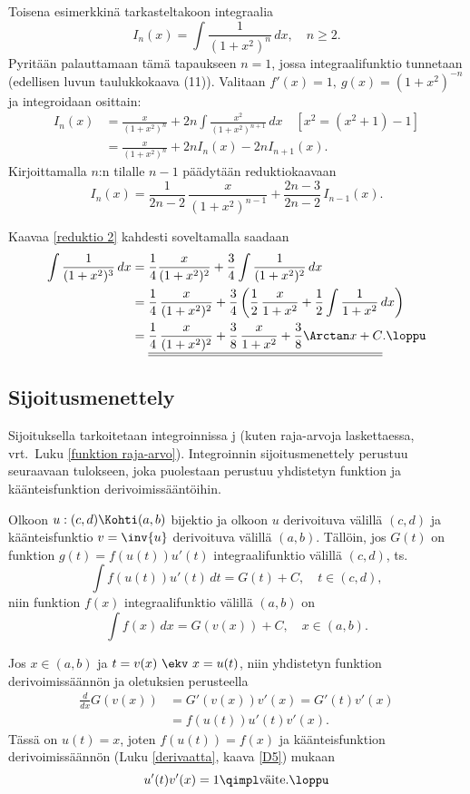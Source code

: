 Toisena esimerkkinä tarkasteltakoon integraalia
\[
I_n(x)=\int\frac{1}{(1+x^2)^n}\,dx,\quad n \ge 2.
\]
Pyritään palauttamaan tämä tapaukseen $n=1$, jossa integraalifunktio tunnetaan (edellisen
luvun taulukkokaava (11)). Valitaan $f'(x)=1,\ g(x)=(1+x^2)^{-n}$ ja integroidaan osittain:
\begin{align*}
I_n(x) &= \frac{x}{(1+x^2)^n}+2n\int\frac{x^2}{(1+x^2)^{n+1}}\, dx \quad [x^2=(x^2+1)-1] \\
&= \frac{x}{(1+x^2)^n}+2n I_n(x) - 2n I_{n+1}(x).
\end{align*}
Kirjoittamalla $n$:n tilalle $n-1$ päädytään reduktiokaavaan
\begin{equation} \label{reduktio 2}
I_n(x)=\frac{1}{2n-2}\,\frac{x}{(1+x^2)^{n-1}}+\frac{2n-3}{2n-2}\,I_{n-1}(x).
\end{equation}
\begin{Exa}
Kaavaa \eqref{reduktio 2} kahdesti soveltamalla saadaan
\begin{align*}
\int\frac{1}{(1+x^2)^3}\,dx 
&= \frac{1}{4}\frac{x}{(1+x^2)^2}+\frac{3}{4}\int\frac{1}{(1+x^2)^2}\,dx \\
&= \frac{1}{4}\,\frac{x}{(1+x^2)^2}+\frac{3}{4}
        \left(\frac{1}{2}\,\frac{x}{1+x^2}+\frac{1}{2}\int \frac{1}{1+x^2}\,dx\right) \\
&= \underline{\underline{\frac{1}{4}\,
         \frac{x}{(1+x^2)^2}+\frac{3}{8}\,\frac{x}{1+x^2}+\frac{3}{8}\Arctan x+C}}. \loppu
\end{align*}
\end{Exa}

\subsection{Sijoitusmenettely}

Sijoituksella tarkoitetaan integroinnissa j 
(kuten raja-arvoja laskettaessa, vrt.\ Luku \ref{funktion raja-arvo}). Integroinnin 
sijoitusmenettely perustuu seuraavaan tulokseen, joka puolestaan perustuu yhdistetyn funktion
ja käänteisfunktion derivoimissääntöihin.
\begin{Prop} \label{sijoituspropositio}
Olkoon $u:(c,d)\Kohti (a,b)$ bijektio ja olkoon $u$ derivoituva välillä $(c,d)$ ja
käänteisfunktio $v=\inv{u}$ derivoituva välillä $(a,b)$. Tällöin, jos $G(t)$ on funktion
$g(t)=f(u(t))u'(t)$ integraalifunktio välillä $(c,d)$, ts.\
\[
\int f(u(t))u'(t)\, dt=G(t)+C,\quad t\in (c,d),
\]
niin funktion $f(x)$ integraalifunktio välillä $(a,b)$ on
\[
\int f(x)\, dx=G(v(x))+C,\quad x\in (a,b).
\]
\end{Prop}
\tod Jos $x\in (a,b)$ ja $t=v(x) \ \ekv \ x=u(t)$, niin yhdistetyn funktion derivoimissäännön
ja oletuksien perusteella
\begin{align*}
\frac{d}{dx}G(v(x)) &= G'(v(x))v'(x)=G'(t)v'(x) \\
&= f(u(t))u'(t)v'(x).
\end{align*}
Tässä on $u(t)=x$, joten $f(u(t))=f(x)$ ja käänteisfunktion derivoimissäännön
(Luku \ref{derivaatta}, kaava \eqref{D5}) mukaan
\[ 
u'(t)v'(x)=1 \qimpl \text{väite}. \loppu 
\]

